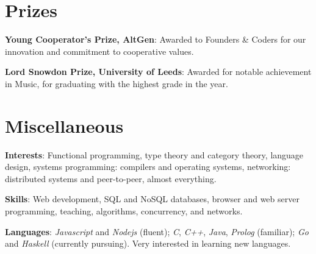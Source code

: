 \documentclass[letterpaper]{article}
\begin{document}
\section*{Prizes}
\begin{list1}
  \item \textbf{Young Cooperator's Prize, AltGen}: Awarded to Founders \& Coders for our innovation and commitment to cooperative values.
  \item \textbf{Lord Snowdon Prize, University of Leeds}: Awarded for notable achievement in Music, for graduating with the highest grade in the year.
\end{list1}

\section*{Miscellaneous}
  
\begin{list1}
  \item \textbf{Interests}: Functional programming, type theory and category theory, language design, systems programming: compilers and operating systems, networking: distributed systems and peer-to-peer, almost everything.
  \item \textbf{Skills}: Web development, SQL and NoSQL databases, browser and web server programming, teaching, algorithms, concurrency, and networks.
  \item \textbf{Languages}: \emph{Javascript} and \emph{Nodejs} (fluent); \emph{C}, \emph{C++}, \emph{Java}, \emph{Prolog} (familiar); \emph{Go} and \emph{Haskell} (currently pursuing). Very interested in learning new languages.
\end{list1}
\end{document}
